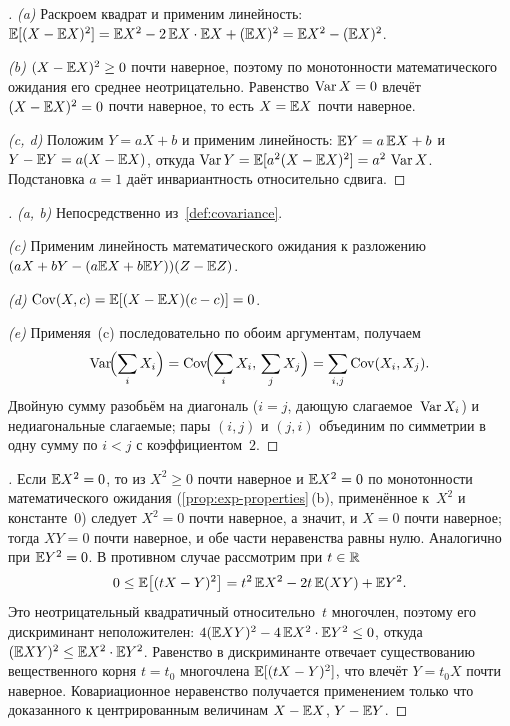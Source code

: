 \begin{proof}[]
\emph{(a)} Раскроем квадрат и применим линейность: $\mathbb{E}[(X - \mathbb{E} X)^2] = \mathbb{E} X^2 - 2\, \mathbb{E} X \cdot \mathbb{E} X + (\mathbb{E} X)^2 = \mathbb{E} X^2 - (\mathbb{E} X)^2$.

\emph{(b)} $(X - \mathbb{E} X)^2 \geq 0$ почти наверное, поэтому по монотонности математического ожидания его среднее неотрицательно. Равенство $\operatorname{Var} X = 0$ влечёт $(X - \mathbb{E} X)^2 = 0$ почти наверное, то есть $X = \mathbb{E} X$ почти наверное.

\emph{(c, d)} Положим $Y = aX + b$ и применим линейность: $\mathbb{E} Y = a\, \mathbb{E} X + b$ и $Y - \mathbb{E} Y = a(X - \mathbb{E} X)$, откуда $\operatorname{Var} Y = \mathbb{E}[a^2 (X - \mathbb{E} X)^2] = a^2\, \operatorname{Var} X$. Подстановка $a = 1$ даёт инвариантность относительно сдвига.
\end{proof}

\begin{proof}[]
\emph{(a, b)} Непосредственно из~\cref{def:covariance}.

\emph{(c)} Применим линейность математического ожидания к разложению $(aX + bY - (a \mathbb{E} X + b \mathbb{E} Y))(Z - \mathbb{E} Z)$.

\emph{(d)} $\operatorname{Cov}(X, c) = \mathbb{E}[(X - \mathbb{E} X)(c - c)] = 0$.

\emph{(e)} Применяя~(c) последовательно по обоим аргументам, получаем
\[
  \operatorname{Var}\!\Bigl(\sum_i X_i\Bigr) = \operatorname{Cov}\!\Bigl(\sum_i X_i,\, \sum_j X_j\Bigr) = \sum_{i, j} \operatorname{Cov}(X_i, X_j).
\]
Двойную сумму разобьём на диагональ ($i = j$, дающую слагаемое~$\operatorname{Var} X_i$) и недиагональные слагаемые; пары $(i, j)$ и $(j, i)$ объединим по симметрии в одну сумму по $i < j$ с коэффициентом~$2$.
\end{proof}

\begin{proof}[]
Если $\mathbb{E} X^2 = 0$, то из $X^2 \geq 0$ почти наверное и $\mathbb{E} X^2 = 0$ по монотонности математического ожидания (\cref{prop:exp-properties}\,(b), применённое к~$X^2$ и константе~$0$) следует $X^2 = 0$ почти наверное, а значит, и $X = 0$ почти наверное; тогда $XY = 0$ почти наверное, и обе части неравенства равны нулю. Аналогично при $\mathbb{E} Y^2 = 0$. В противном случае рассмотрим при $t \in \mathbb{R}$
\[
  0 \leq \mathbb{E}\bigl[(tX - Y)^2\bigr] = t^2\, \mathbb{E} X^2 - 2t\, \mathbb{E}(XY) + \mathbb{E} Y^2.
\]
Это неотрицательный квадратичный относительно~$t$ многочлен, поэтому его дискриминант неположителен: $4 (\mathbb{E} XY)^2 - 4\, \mathbb{E} X^2 \cdot \mathbb{E} Y^2 \leq 0$, откуда $(\mathbb{E} XY)^2 \leq \mathbb{E} X^2 \cdot \mathbb{E} Y^2$. Равенство в дискриминанте отвечает существованию вещественного корня $t = t_0$ многочлена $\mathbb{E}[(tX - Y)^2]$, что влечёт $Y = t_0 X$ почти наверное. Ковариационное неравенство получается применением только что доказанного к центрированным величинам $X - \mathbb{E} X$, $Y - \mathbb{E} Y$.
\end{proof}

